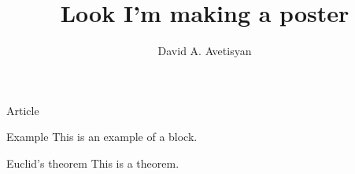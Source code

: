\documentclass[xcolor={svgnames}]{beamer}
\title{Look I'm making a poster}
\author{David A. Avetisyan}
\institute{RUDN University}
\begin{document}
\begin{frame}{Article}
\begin{block}{Example}
This is an example of a block.
\end{block}
\begin{block}{Euclid's theorem}
This is a theorem.
\end{block}
\end{frame}
\end{document}
